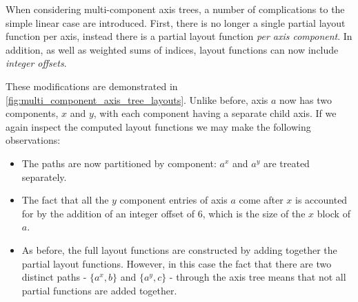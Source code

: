 \documentclass[thesis]{subfiles}
\begin{document}
When considering multi-component axis trees, a number of complications to the simple linear case are introduced.
First, there is no longer a single partial layout function per axis, instead there is a partial layout function \emph{per axis component}.
In addition, as well as weighted sums of indices, layout functions can now include \emph{integer offsets}.

These modifications are demonstrated in \cref{fig:multi_component_axis_tree_layouts}.
Unlike before, axis $a$ now has two components, $x$ and $y$, with each component having a separate child axis.
If we again inspect the computed layout functions we may make the following observations:
\begin{itemize}
  \item
    The paths are now partitioned by component: $a^x$ and $a^y$ are treated separately.
  \item
    The fact that all the $y$ component entries of axis $a$ come after $x$ is accounted for by the addition of an integer offset of 6, which is the size of the $x$ block of $a$.
  \item
    As before, the full layout functions are constructed by adding together the partial layout functions.
    However, in this case the fact that there are two distinct paths - $\{a^x, b\}$ and $\{a^y, c\}$ - through the axis tree means that not all partial functions are added together.
\end{itemize}
\end{document}
